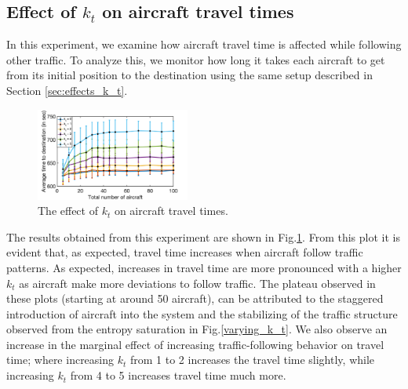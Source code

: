 \documentclass[conference, letter]{IEEEtran}
\begin{document}

\subsection{Effect of $k_t$ on aircraft travel times}
In this experiment, we examine how aircraft travel time is affected while following other traffic. To analyze this, we monitor how long it takes each aircraft to get from its initial position to the destination using the same setup described in Section \ref{sec:effects_k_t}. 
\begin{figure}[hbt!]
\centering
\includegraphics[width=0.45\textwidth]{time_to_destination2.png}
\caption{The effect of $k_t$ on aircraft travel times.}
\label{time_to_destination}
\end{figure}

The results obtained from this experiment are shown in Fig.\ref{time_to_destination}. From this plot it is evident that, as expected, travel time increases when aircraft follow traffic patterns. As expected, increases in travel time are more pronounced with a higher $k_t$ as aircraft make more deviations to follow traffic. The plateau observed in these plots (starting at around 50 aircraft), can be attributed to the staggered introduction of aircraft into the system and the stabilizing of the traffic structure observed from the entropy saturation in Fig.\ref{varying_k_t}. We also observe an increase in the marginal effect of increasing traffic-following behavior on travel time; where increasing $k_t$ from 1 to 2 increases the travel time slightly, while increasing $k_t$ from 4 to 5 increases travel time much more.  
\end{document}
